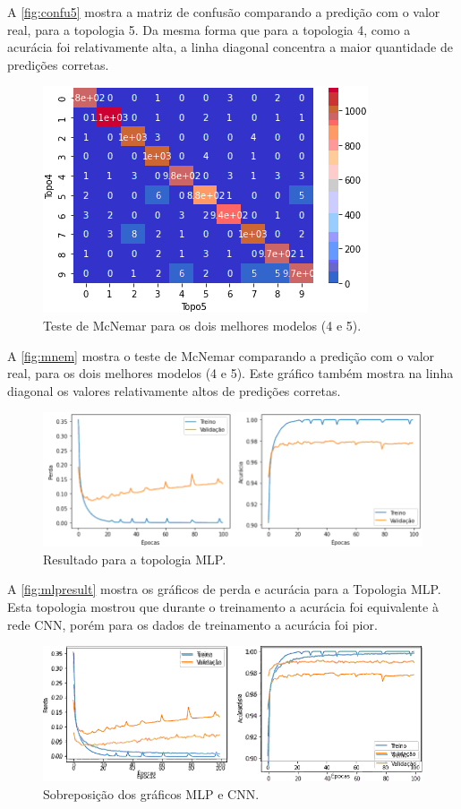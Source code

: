 \documentclass[sigconf, nonacm, screen]{acmart}
\begin{document}
A \autoref{fig:confu5} mostra a matriz de confusão comparando a predição com o valor real, para a topologia 5. Da mesma forma que para a topologia 4, como a acurácia foi relativamente alta, a linha diagonal concentra a maior quantidade de predições corretas.


\begin{figure}[ht]
	\centering
	\includegraphics[width=0.8\linewidth]{img/mnem}
	\caption{Teste de McNemar para os dois melhores modelos (4 e 5).}
	\label{fig:mnem}
\end{figure}

A \autoref{fig:mnem} mostra o teste de McNemar comparando a predição com o valor real, para os dois melhores modelos (4 e 5). Este gráfico também mostra na linha diagonal os valores relativamente altos de predições corretas.


\begin{figure}[ht]
	\centering
	\includegraphics[width=0.8\linewidth]{img/mlpresult}
	\caption{Resultado para a topologia MLP.}
	\label{fig:mlpresult}
\end{figure}

A \autoref{fig:mlpresult} mostra os gráficos de perda e acurácia para a Topologia MLP. Esta topologia mostrou que durante o treinamento a acurácia foi equivalente à rede CNN, porém para os dados de treinamento a acurácia foi pior.


\begin{figure}[ht]
	\centering
	\includegraphics[width=0.8\linewidth]{img/mlpcnn}
	\caption{Sobreposição dos gráficos MLP e CNN.}
	\label{fig:mlpcnn}
\end{figure}
\end{document}
